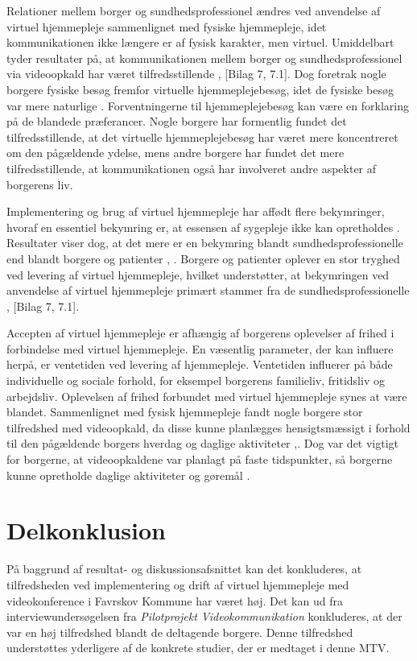 Relationer mellem borger og sundhedsprofessionel ændres ved anvendelse af virtuel hjemmepleje sammenlignet med fysiske hjemmepleje, idet kommunikationen ikke længere er af fysisk karakter, men virtuel. Umiddelbart tyder resultater på, at kommunikationen mellem borger og sundhedsprofessionel via videoopkald har været tilfredsstillende \cite{Baf2}, [Bilag 7, 7.1]. Dog foretrak nogle borgere fysiske besøg fremfor virtuelle hjemmeplejebesøg, idet de fysiske besøg var mere naturlige \cite{kandidat}. 
Forventningerne til hjemmeplejebesøg kan være en forklaring på de blandede præferancer. Nogle borgere har formentlig fundet det tilfredsstillende, at det virtuelle hjemmeplejebesøg har været mere koncentreret om den pågældende ydelse, mens andre borgere har fundet det mere tilfredsstillende, at kommunikationen også har involveret andre aspekter af borgerens liv.

Implementering og brug af virtuel hjemmepleje har affødt flere bekymringer, hvoraf en essentiel bekymring er, at essensen af sygepleje ikke kan opretholdes \cite{telenursing}. Resultater viser dog, at det mere er en bekymring blandt sundhedsprofessionelle end blandt borgere og patienter \cite{telenursing}, \cite{Mair}. Borgere og patienter oplever en stor tryghed ved levering af virtuel hjemmepleje, hvilket understøtter, at bekymringen ved anvendelse af virtuel hjemmepleje primært stammer fra de sundhedsprofessionelle \cite{Baf2}, [Bilag 7, 7.1]. 

Accepten af virtuel hjemmepleje er afhængig af borgerens oplevelser af frihed i forbindelse med virtuel hjemmepleje. En væsentlig parameter, der kan influere herpå, er ventetiden ved levering af hjemmepleje. Ventetiden influerer på både individuelle og sociale forhold, for eksempel borgerens familieliv, fritidsliv og arbejdsliv. Oplevelsen af frihed forbundet med virtuel hjemmepleje synes at være blandet. Sammenlignet med fysisk hjemmepleje fandt nogle borgere stor tilfredshed med videoopkald, da disse kunne planlægges hensigtsmæssigt i forhold til den pågældende borgers hverdag og daglige aktiviteter \cite{kandidat},\cite{wade}. Dog var det vigtigt for borgerne, at videoopkaldene var planlagt på faste tidspunkter, så borgerne kunne opretholde daglige aktiviteter og gøremål \cite{kandidat}.

\section{Delkonklusion}
På baggrund af resultat- og diskussionsafsnittet kan det konkluderes, at tilfredsheden ved implementering og drift af virtuel hjemmepleje med videokonference i Favrskov Kommune har været høj. Det kan ud fra interviewundersøgelsen fra \textit{Pilotprojekt Videokommunikation} konkluderes, at der var en høj tilfredshed blandt de deltagende borgere. Denne tilfredshed understøttes yderligere af de konkrete studier, der er medtaget i denne MTV.

